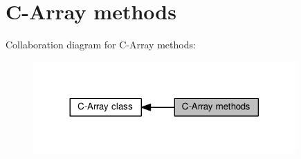 \section{C-\/\+Array methods}
\label{group__method__group}
Collaboration diagram for C-\/\+Array methods\+:\nopagebreak
\begin{figure}[H]
\begin{center}
\leavevmode
\includegraphics[width=284pt]{group__method__group}
\end{center}
\end{figure}
